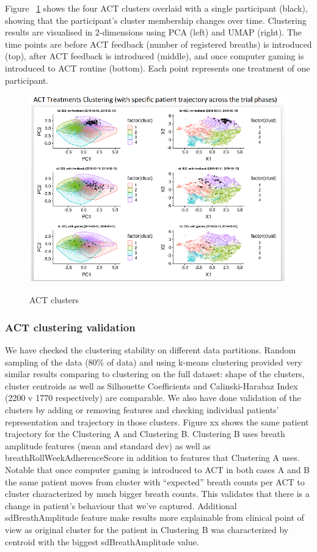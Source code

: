 \documentclass{article}
\begin{document}
Figure ~\ref{fig:act_res}  shows the four ACT clusters overlaid with a single participant (black), showing that the participant’s cluster membership changes over time. Clustering results are visualised in 2-dimensions using PCA (left) and UMAP (right). The time points are before ACT feedback (number of registered breaths) is introduced (top), after ACT feedback is introduced (middle), and once computer gaming is introduced to ACT routine (bottom). Each point represents one treatment of one participant. 
\begin{figure}[!htb]
  \centering
  \caption{ACT clusters}
  \includegraphics[]{fig_ACT_clust}
  \label{fig:act_res}
\end{figure}

\subsubsection{ACT clustering validation}

We have checked the clustering stability on different data partitions.  Random sampling of the data (80\% of data) and using k-means clustering provided very similar results comparing to clustering on the full dataset:  shape of the clusters, cluster centroids as well as Silhouette Coefficients and Calinski-Harabaz Index  (2200 v 1770 respectively) are comparable. 
We also have done validation of the clusters by adding or removing features and checking individual patients’ representation and trajectory in those clusters. Figure xx shows the same patient trajectory for the Clustering A and Clustering B. Clustering B uses breath amplitude features (mean and standard dev) as well as breathRollWeekAdherenceScore in addition to features that Clustering A uses. Notable that  once computer gaming is introduced to ACT in both cases A and B the same patient moves from cluster with “expected” breath counts per ACT to cluster characterized by much bigger breath counts. This validates that there is a change in patient’s behaviour that we’ve captured. Additional sdBreathAmplitude feature make results more explainable from clinical point of view as original cluster for the patient in Clustering B was characterized by centroid with the biggest sdBreathAmplitude value. 
\end{document}
